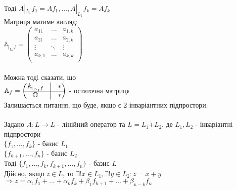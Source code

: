 \documentclass[a4paper, 14pt]{extarticle}
\def\bigline{\vspace{5mm}\\}
\begin{document}
Тоді $A|_{L_1} f_1 = Af_1 , \dots, A|_{L_1}f_k = Af_k$\\
Матриця матиме вигляд:\\
$\mathbb{A}_{|_{L_1}f} = \begin{pmatrix}
a_{11} & \dots & a_{1,k}\\
a_{21} & \dots & a_{2,k}\\
\vdots & \ddots & \vdots\\
a_{k,1} & \dots & a_{k,k}\\
\end{pmatrix}$\\
\\
Можна тоді сказати, що\\
$\mathbb{A}_f = \begin{pmatrix}
 \mathbb{A}_{|_{L_1}f}  & \vline & * \\
 \hline
 \mathbb{O} & \vline & *
\end{pmatrix}$ - остаточна матриця
\bigline
Залишається питання, що буде, якщо є 2 інваріантних підпростори:
\bigline
\\
Задано $A: L \to L$ - лінійний оператор та $L = L_1 \dot{+} L_2$, де $L_1,L_2$ - інваріантні підпростори\\
$\{f_1,\dots,f_k\}$ - базис $L_1$\\
$\{f_{k+1},\dots,f_{n}\}$ - базис $L_2$\\
Тоді $\{f_1,\dots,f_k,f_{k+1},\dots,f_n\}$ - базис $L$\\
Дійсно, якщо $z \in L$, то $\exists! x \in L_1, \exists! y \in L_2: z = x + y$\\
$\Rightarrow z = \alpha_1 f_1 + \dots + \alpha_k f_k + \beta_1 f_{k+1} + \dots + \beta_{n-k}f_n$\\
\end{document}
